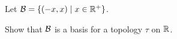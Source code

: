 \begin{comment}
	\item Suppose $a$ is odd and $b$ is even. Then $a + bk$ is odd and so $f(a+bk) = (a-1)+bk$. So $f(A_{a,b}) = A_{a-1,b}$. 
	
	\item Suppose $a$ is even and $b$ is odd. We consider two sub-cases.
		\begin{itemize}
		\item Suppose $k$ is even. Then $k = 2n$ for some integer $n$, and $a + bk = a + b(2n)$ is even. So $f(a+bk) = (a+1)+bk = (a+1) + 2b n$. These elements are in $A_{a+1,2b})$. 
		\item Suppose $k$ is odd.  Then $k = 2n+1$ for some integer $n$, and $a + bk = a + b(2n+1) = (a+b) + 2bn$ is odd. So $f(a+bk) = (a-1)+bk = (a+b-1) + 2b n$. These elements are in $A_{a+b-1,2b})$. It follows that $f(A_{a,b}) = A_{a+1,2b} \cup A_{a+b-1,2b}$. 
		\end{itemize}
		 
	\item Suppose $a$ is odd and $b$ is odd. We consider two sub-cases.
		\begin{itemize}
		\item Suppose $k$ is even. Then $k = 2n$ for some integer $n$, and $a + bk = a + b(2n)$ is odd. So $f(a+bk) = (a-1)+bk = (a-1) + 2b n$. These elements are in $A_{a-1,2b})$. 
		\item Suppose $k$ is odd.  Then $k = 2n+1$ for some integer $n$, and $a + bk = a + b(2n+1) = (a+b) + 2bn$ is even. So $f(a+bk) = (a+1)+bk = (a+b+1) + 2b n$. These elements are in $A_{a+b+1,2b})$. It follows that $f(A_{a,b}) = A_{a-1,2b} \cup A_{a+b+1,2b}$. 
		\end{itemize}

	\item Note that if $n$ is even, then $n+1$ is odd and $f(f(n)) = f(n+1) = (n+1)-1 = n$. If $n$ is odd, then $n-1$ is even and $f(f(n)) = f(n-1) = (n-1)+1 = n$. So $f^{-1} = f$. Thus, $f^{-1}(A_{a,b}) = f(A_{a,b})$, which is open in $\Z$. 
	
	\end{itemize}
	
	\end{enumerate}
	
	\ea

\end{comment}

\item \label{ex:coarse_topology_example} Let $\mathcal{B} = \{(-x,x) \mid x \in \mathbb{R}^+\}$.  
	\ba
	\item Show that $\mathcal{B}$ is a basis for a topology $\tau$ on $\mathbb{R}$.
	
